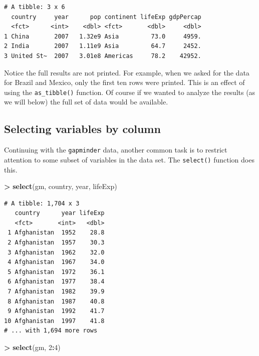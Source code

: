 \documentclass[]{krantz}
\makeatletter
\newenvironment{Shaded}{\begin{snugshade}}{\end{snugshade}}
\newcommand{\KeywordTok}[1]{\textcolor[rgb]{0.27,0.27,0.27}{\textbf{#1}}}
\newcommand{\DecValTok}[1]{\textcolor[rgb]{0.06,0.06,0.06}{#1}}
\newcommand{\StringTok}[1]{\textcolor[rgb]{0.5,0.5,0.5}{#1}}
\newcommand{\OperatorTok}[1]{\textcolor[rgb]{0.43,0.43,0.43}{\textbf{#1}}}
\newcommand{\NormalTok}[1]{#1}
\newenvironment{kframe}{%
\medskip{}
\setlength{\fboxsep}{.8em}
 \def\at@end@of@kframe{}%
 \ifinner\ifhmode%
  \def\at@end@of@kframe{\end{minipage}}%
  \begin{minipage}{\columnwidth}%
 \fi\fi%
 \def\FrameCommand##1{\hskip\@totalleftmargin \hskip-\fboxsep
 \colorbox{shadecolor}{##1}\hskip-\fboxsep
     \hskip-\linewidth \hskip-\@totalleftmargin \hskip\columnwidth}%
 \MakeFramed {\advance\hsize-\width
   \@totalleftmargin\z@ \linewidth\hsize
   \@setminipage}}%
 {\par\unskip\endMakeFramed%
 \at@end@of@kframe}
\renewenvironment{Shaded}{\begin{kframe}}{\end{kframe}}
\makeatother
\begin{document}
\begin{verbatim}
# A tibble: 3 x 6
  country     year      pop continent lifeExp gdpPercap
  <fct>      <int>    <dbl> <fct>       <dbl>     <dbl>
1 China       2007   1.32e9 Asia         73.0     4959.
2 India       2007   1.11e9 Asia         64.7     2452.
3 United St~  2007   3.01e8 Americas     78.2    42952.
\end{verbatim}

Notice the full results are not printed. For example, when we asked for
the data for Brazil and Mexico, only the first ten rows were printed.
This is an effect of using the \texttt{as\_tibble()} function. Of course
if we wanted to analyze the results (as we will below) the full set of
data would be available.

\subsection{Selecting variables by
column}\label{selecting-variables-by-column}

Continuing with the \texttt{gapminder} data, another common task is to
restrict attention to some subset of variables in the data set. The
\texttt{select()} function does this.

\begin{Shaded}
\begin{Highlighting}[]
\OperatorTok{>}\StringTok{ }\KeywordTok{select}\NormalTok{(gm, country, year, lifeExp)}
\end{Highlighting}
\end{Shaded}

\begin{verbatim}
# A tibble: 1,704 x 3
   country      year lifeExp
   <fct>       <int>   <dbl>
 1 Afghanistan  1952    28.8
 2 Afghanistan  1957    30.3
 3 Afghanistan  1962    32.0
 4 Afghanistan  1967    34.0
 5 Afghanistan  1972    36.1
 6 Afghanistan  1977    38.4
 7 Afghanistan  1982    39.9
 8 Afghanistan  1987    40.8
 9 Afghanistan  1992    41.7
10 Afghanistan  1997    41.8
# ... with 1,694 more rows
\end{verbatim}

\begin{Shaded}
\begin{Highlighting}[]
\OperatorTok{>}\StringTok{ }\KeywordTok{select}\NormalTok{(gm, }\DecValTok{2}\OperatorTok{:}\DecValTok{4}\NormalTok{)}
\end{Highlighting}
\end{Shaded}
\end{document}
